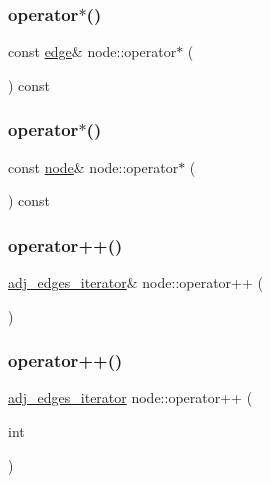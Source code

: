 \subsubsection{\texorpdfstring{operator$\ast$()}{operator*()}\hspace{0.1cm}{\footnotesize\ttfamily [2/3]}}
{\footnotesize\ttfamily const \mbox{\hyperlink{classedge}{edge}}\& node\+::operator$\ast$ (\begin{DoxyParamCaption}{ }\end{DoxyParamCaption}) const}

\mbox{\label{classnode_a59fdf9aff393a47b4c60c3f21a4ccbc8}} 
\subsubsection{\texorpdfstring{operator$\ast$()}{operator*()}\hspace{0.1cm}{\footnotesize\ttfamily [3/3]}}
{\footnotesize\ttfamily const \mbox{\hyperlink{classnode}{node}}\& node\+::operator$\ast$ (\begin{DoxyParamCaption}{ }\end{DoxyParamCaption}) const}

\mbox{\label{classnode_a5849d021a696f38d1b2e1d3d3372bbe7}} 
\subsubsection{\texorpdfstring{operator++()}{operator++()}\hspace{0.1cm}{\footnotesize\ttfamily [1/6]}}
{\footnotesize\ttfamily \mbox{\hyperlink{classnode_abdd49248203010f2d5432dfef22d017a}{adj\+\_\+edges\+\_\+iterator}}\& node\+::operator++ (\begin{DoxyParamCaption}{ }\end{DoxyParamCaption})}

\mbox{\label{classnode_ac112a3065e69e4897d38c11980fe1789}} 
\subsubsection{\texorpdfstring{operator++()}{operator++()}\hspace{0.1cm}{\footnotesize\ttfamily [2/6]}}
{\footnotesize\ttfamily \mbox{\hyperlink{classnode_abdd49248203010f2d5432dfef22d017a}{adj\+\_\+edges\+\_\+iterator}} node\+::operator++ (\begin{DoxyParamCaption}\item[{int}]{ }\end{DoxyParamCaption})}

